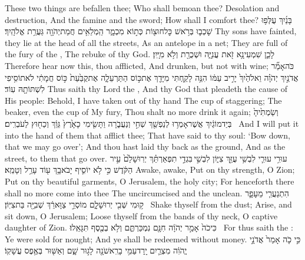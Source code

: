 {These two things are befallen thee; Who shall bemoan thee? Desolation and destruction, And the famine and the sword; How shall I comfort thee?}
{בָּנַ֜יִךְ עֻלְּפ֥וּ שָׁכְב֛וּ בְּרֹ֥אשׁ כׇּל\maqqaf חוּצ֖וֹת כְּת֣וֹא מִכְמָ֑ר הַֽמְלֵאִ֥ים חֲמַת\maqqaf יְהֹוָ֖ה גַּעֲרַ֥ת אֱלֹהָֽיִךְ׃}
{Thy sons have fainted, they lie at the head of all the streets, As an antelope in a net; They are full of the fury of the \lord, The rebuke of thy God.}
{לָכֵ֛ן שִׁמְעִי\maqqaf נָ֥א זֹ֖את עֲנִיָּ֑ה וּשְׁכֻרַ֖ת וְלֹ֥א מִיָּֽיִן׃ \petucha }
{Therefore hear now this, thou afflicted, And drunken, but not with wine;}
{כֹּה\maqqaf אָמַ֞ר אֲדֹנַ֣יִךְ יְהֹוָ֗ה וֵאלֹהַ֙יִךְ֙ יָרִ֣יב עַמּ֔וֹ הִנֵּ֥ה לָקַ֛חְתִּי מִיָּדֵ֖ךְ אֶת\maqqaf כּ֣וֹס הַתַּרְעֵלָ֑ה אֶת\maqqaf קֻבַּ֙עַת֙ כּ֣וֹס חֲמָתִ֔י לֹא\maqqaf תוֹסִ֥יפִי לִשְׁתּוֹתָ֖הּ עֽוֹד׃}
{Thus saith thy Lord the \lord, And thy God that pleadeth the cause of His people: Behold, I have taken out of thy hand The cup of staggering; The beaker, even the cup of My fury, Thou shalt no more drink it again;}
{וְשַׂמְתִּ֙יהָ֙ בְּיַד\maqqaf מוֹגַ֔יִךְ אֲשֶׁר\maqqaf אָמְר֥וּ לְנַפְשֵׁ֖ךְ שְׁחִ֣י וְנַעֲבֹ֑רָה וַתָּשִׂ֤ימִי כָאָ֙רֶץ֙ גֵּוֵ֔ךְ וְכַח֖וּץ לַעֹבְרִֽים׃ \petucha }
{And I will put it into the hand of them that afflict thee; That have said to thy soul: ‘Bow down, that we may go over’; And thou hast laid thy back as the ground, And as the street, to them that go over.}
\newperek
{}
{עוּרִ֥י עוּרִ֛י לִבְשִׁ֥י עֻזֵּ֖ךְ צִיּ֑וֹן לִבְשִׁ֣י \legarmeh  בִּגְדֵ֣י תִפְאַרְתֵּ֗ךְ יְרֽוּשָׁלַ֙͏ִם֙ עִ֣יר הַקֹּ֔דֶשׁ כִּ֣י לֹ֥א יוֹסִ֛יף יָבֹא\maqqaf בָ֥ךְ ע֖וֹד עָרֵ֥ל וְטָמֵֽא׃}
{Awake, awake, Put on thy strength, O Zion; Put on thy beautiful garments, O Jerusalem, the holy city; For henceforth there shall no more come into thee The uncircumcised and the unclean.}
{הִתְנַעֲרִ֧י מֵעָפָ֛ר ק֥וּמִי שְּׁבִ֖י יְרוּשָׁלָ֑͏ִם  מוֹסְרֵ֣י צַוָּארֵ֔ךְ שְׁבִיָּ֖ה בַּת\maqqaf צִיּֽוֹן׃ \setuma }
{Shake thyself from the dust; Arise, and sit down, O Jerusalem; Loose thyself from the bands of thy neck, O captive daughter of Zion.}
{כִּי\maqqaf כֹה֙ אָמַ֣ר יְהֹוָ֔ה חִנָּ֖ם נִמְכַּרְתֶּ֑ם וְלֹ֥א בְכֶ֖סֶף תִּגָּאֵֽלוּ׃ \setuma }
{For thus saith the \lord: Ye were sold for nought; And ye shall be redeemed without money.}
{כִּ֣י כֹ֤ה אָמַר֙ אֲדֹנָ֣י יֱהֹוִ֔ה מִצְרַ֛יִם יָֽרַד\maqqaf עַמִּ֥י בָרִֽאשֹׁנָ֖ה לָג֣וּר שָׁ֑ם וְאַשּׁ֖וּר בְּאֶ֥פֶס עֲשָׁקֽוֹ׃}
